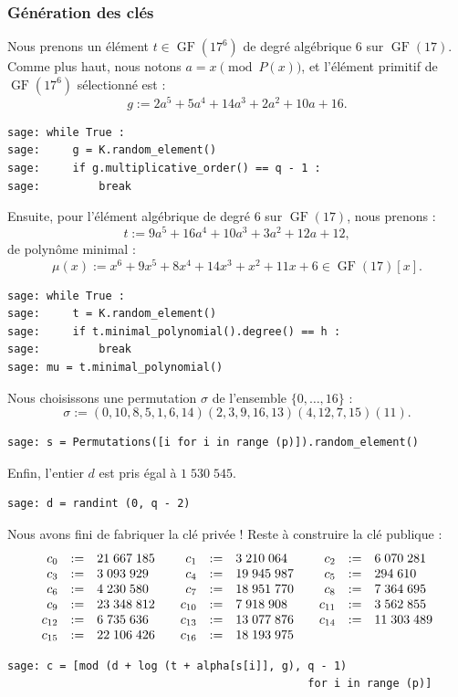 \documentclass[a4paper, titlepage, 11pt]{article}
\theoremstyle{definition}
\theoremstyle{remark}
\def\gf{\operatorname{GF}}
\begin{document}
\subsubsection*{Génération des clés}
Nous prenons un élément $t\in\gf(17^6)$ de degré algébrique $6$ sur $\gf(17)$. Comme plus haut, nous notons $a = x \pmod{P(x)}$, et l'élément primitif de $\gf(17^6)$ sélectionné est :
$$g := 2a^5 + 5a^4 + 14a^3 + 2a^2 + 10a + 16.$$
\begin{verbatim}    
sage: while True :
sage:     g = K.random_element()
sage:     if g.multiplicative_order() == q - 1 :
sage:         break
\end{verbatim}
Ensuite, pour l'élément algébrique de degré $6$ sur $\gf(17)$, nous prenons :
$$t := 9a^5 + 16a^4 + 10a^3 + 3a^2 + 12a + 12,$$
de polynôme minimal :
$$\mu(x) := x^6 + 9x^5 + 8x^4 + 14x^3 + x^2 + 11x + 6\in\gf(17)[x].$$
\begin{verbatim}    
sage: while True :
sage:     t = K.random_element()
sage:     if t.minimal_polynomial().degree() == h :
sage:         break
sage: mu = t.minimal_polynomial()
\end{verbatim}
Nous choisissons une permutation $\sigma$ de l'ensemble $\{0, \dots, 16\}$ :
$$\sigma := (0,10,8,5,1,6,14)(2,3,9,16,13)(4,12,7,15)(11).$$
\begin{verbatim}
sage: s = Permutations([i for i in range (p)]).random_element()
\end{verbatim}
Enfin, l'entier $d$ est pris égal à $1\;530\;545$.
\begin{verbatim}
sage: d = randint (0, q - 2)
\end{verbatim}
Nous avons fini de fabriquer la clé privée ! Reste à construire la clé publique :
$$\begin{array}{r c l c r c l c r c l}
c_0 &:=& 21\;667\;185 &&
c_1 &:=& 3\;210\;064 &&
c_2 &:=& 6\;070\;281 \\
c_3 &:=& 3\;093\;929 &&
c_4 &:=& 19\;945\;987 &&
c_5 &:=& 294\;610 \\
c_6 &:=& 4\;230\;580 &&
c_7 &:=& 18\;951\;770 &&
c_8 &:=& 7\;364\;695 \\
c_9 &:=& 23\;348\;812 &&
c_{10} &:=& 7\;918\;908 &&
c_{11} &:=& 3\;562\;855 \\
c_{12} &:=& 6\;735\;636 &&
c_{13} &:=& 13\;077\;876 &&
c_{14} &:=& 11\;303\;489 \\
c_{15} &:=& 22\;106\;426 &&
c_{16} &:=& 18\;193\;975 
\end{array}$$
\begin{verbatim}
sage: c = [mod (d + log (t + alpha[s[i]], g), q - 1) 
                                              for i in range (p)]
\end{verbatim}
\end{document}

